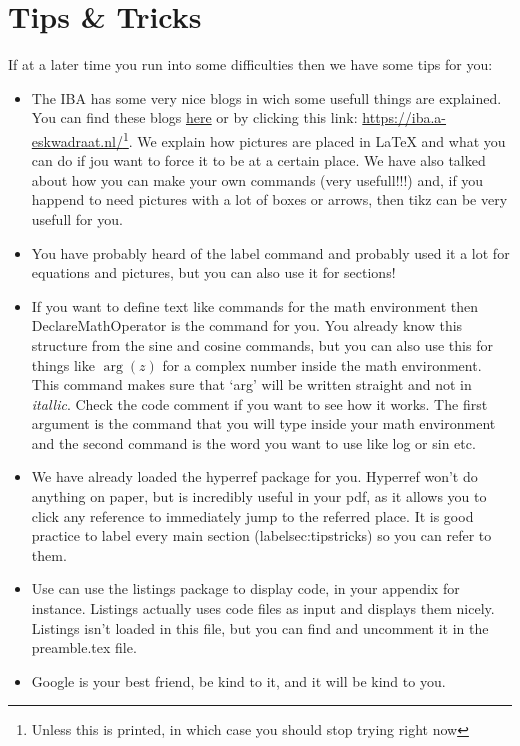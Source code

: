 \documentclass[thesis]{subfiles}
\begin{document}
\section{Tips \& Tricks}
If at a later time you run into some difficulties then we have some tips for you:
\begin{itemize}
\item The IBA has some very nice blogs in wich some usefull things are explained. You can find these blogs \href{https://iba.a-eskwadraat.nl/}{here} or by clicking this link: \url{https://iba.a-eskwadraat.nl/}\footnote{Unless this is printed, in which case you should stop trying right now}. We explain how pictures are placed in LaTeX and what you can do if jou want to force it to be at a certain place. We have also talked about how you can make your own commands (very usefull!!!) and, if you happend to need pictures with a lot of boxes or arrows, then tikz can be very usefull for you.

\item You have probably heard of the label command and probably used it a lot for equations and pictures, but you can also use it for sections!

\item If you want to define text like commands for the math environment then DeclareMathOperator is the command for you. You already know this structure from the sine and cosine commands, but you can also use this for things like $\arg(z)$ for a complex number inside the math environment. This command makes sure that `arg' will be written straight and not in \textit{itallic}. Check the code comment if you want to see how it works. The first argument is the command that you will type inside your math environment and the second command is the word you want to use like log or sin etc.

\item We have already loaded the hyperref package for you. Hyperref won't do anything on paper, but is incredibly useful in your pdf, as it allows you to click any reference to immediately jump to the referred place. It is good practice to label every main section (label{sec:tipstricks}) so you can refer to them.

\item Use can use the listings package to display code, in your appendix for instance. Listings actually uses code files as input and displays them nicely. Listings isn't loaded in this file, but you can find and uncomment it in the preamble.tex file.

\item Google is your best friend, be kind to it, and it will be kind to you.
\end{itemize}
\end{document}
